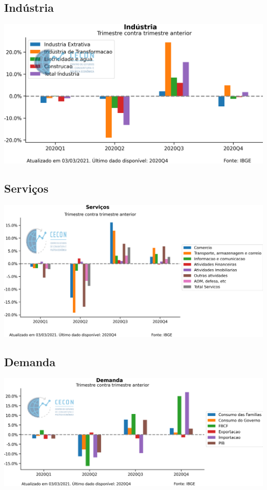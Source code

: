 \documentclass{SelfArx}
\begin{document}
\subsection*{Indústria}
\label{sec:orgb745346}

\begin{center}
\includegraphics[width=.9\linewidth]{./figs/PIB/Industria.png}
\end{center}


\subsection*{Serviços}
\label{sec:org59b1cc8}

\begin{center}
\includegraphics[width=.9\linewidth]{./figs/PIB/Servicos.png}
\end{center}

\subsection*{Demanda}
\label{sec:org67be330}

\begin{center}
\includegraphics[width=.9\linewidth]{./figs/PIB/Demanda.png}
\end{center}
\end{document}
